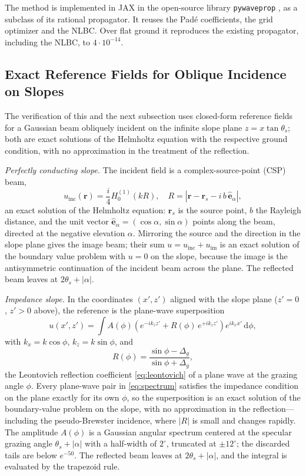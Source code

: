 \documentclass[journal]{IEEEtran}
\begin{document}
The method is implemented in JAX in the open-source library
\texttt{pywaveprop} \cite{pywaveprop}, as a subclass of its rational propagator.
It reuses the Pad\'e coefficients, the grid optimizer and the NLBC. Over flat
ground it reproduces the existing propagator, including the NLBC, to
$4\cdot10^{-14}$.

\subsection{Exact Reference Fields for Oblique Incidence on Slopes}\label{sec:exactref}

The verification of this and the next subsection uses closed-form reference
fields for a Gaussian beam obliquely incident on the infinite slope plane
$z=x\tan\theta_s$; both are exact solutions of the Helmholtz equation with
the respective ground condition, with no approximation in the treatment of
the reflection.

\emph{Perfectly conducting slope.} The incident field is a
complex-source-point (CSP) beam,
\begin{equation}
u_{\mathrm{inc}}(\mathbf{r})=\frac{i}{4}H_0^{(1)}(kR),\quad
R=\left|\mathbf{r}-\mathbf{r}_s-i\,b\,\hat{\mathbf{e}}_{\alpha}\right|,
\label{eq:csp}
\end{equation}
an exact solution of the Helmholtz equation: $\mathbf{r}_s$ is the source
point, $b$ the Rayleigh distance, and the unit vector
$\hat{\mathbf{e}}_{\alpha}=(\cos\alpha,\sin\alpha)$ points along the beam,
directed at the negative elevation $\alpha$.  Mirroring the source and the
direction in the slope plane gives the image beam; their sum
$u=u_{\mathrm{inc}}+u_{\mathrm{im}}$ is an exact solution of the boundary
value problem with $u=0$ on the slope, because the image is the
antisymmetric continuation of the incident beam across the plane.  The
reflected beam leaves at $2\theta_s+|\alpha|$.

\emph{Impedance slope.} In the coordinates $(x',z')$ aligned with the slope
plane ($z'=0$, $z'>0$ above), the reference is the plane-wave superposition
\begin{equation}
u(x',z')=\int A(\phi)\left(e^{-ik_z z'}+R(\phi)\,e^{+ik_z z'}\right)
e^{ik_x x'}\,\mathrm{d}\phi ,
\label{eq:spectrum}
\end{equation}
with $k_x=k\cos\phi$, $k_z=k\sin\phi$, and
\begin{equation}
R(\phi)=\frac{\sin\phi-\Delta_g}{\sin\phi+\Delta_g},
\label{eq:reflR}
\end{equation}
the Leontovich reflection coefficient \eqref{eq:leontovich} of a plane wave
at the grazing angle $\phi$.  Every plane-wave pair in \eqref{eq:spectrum}
satisfies the impedance condition on the plane exactly for its own
$\phi$, so the superposition is an exact solution of the boundary-value
problem on the slope, with no approximation in the reflection---including
the pseudo-Brewster incidence, where $|R|$ is small and changes rapidly.
The amplitude $A(\phi)$ is a Gaussian angular spectrum centered at the
specular grazing angle $\theta_s+|\alpha|$ with a half-width of
$2^{\circ}$, truncated at $\pm12^{\circ}$; the discarded tails are below
$e^{-50}$.  The reflected beam leaves at $2\theta_s+|\alpha|$, and the
integral is evaluated by the trapezoid rule.
\end{document}
